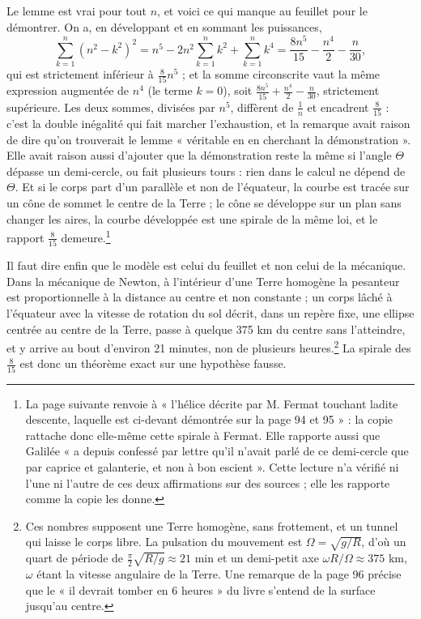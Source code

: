 \documentclass[11pt,a4paper]{article}
\begin{document}
Le lemme est vrai pour tout $n$, et voici ce qui manque au feuillet pour le
démontrer. On a, en développant et en sommant les puissances,
\[
\sum_{k=1}^{n}(n^2-k^2)^2 = n^5 - 2n^2\sum_{k=1}^{n} k^2 + \sum_{k=1}^{n}k^4
 = \frac{8n^5}{15} - \frac{n^4}{2} - \frac{n}{30},
\]
qui est strictement inférieur à $\frac{8}{15}n^5$ ; et la somme circonscrite
vaut la même expression augmentée de $n^4$ (le terme $k = 0$), soit
$\frac{8n^5}{15} + \frac{n^4}{2} - \frac{n}{30}$, strictement supérieure. Les
deux sommes, divisées par $n^5$, diffèrent de $\frac1n$ et encadrent
$\frac{8}{15}$ : c'est la double inégalité qui fait marcher l'exhaustion, et
la remarque avait raison de dire qu'on trouverait le lemme « véritable en en
cherchant la démonstration ». Elle avait raison aussi d'ajouter que la
démonstration reste la même si l'angle $\Theta$ dépasse un demi-cercle, ou
fait plusieurs tours : rien dans le calcul ne dépend de $\Theta$. Et si le
corps part d'un parallèle et non de l'équateur, la courbe est tracée sur un
cône de sommet le centre de la Terre ; le cône se développe sur un plan sans
changer les aires, la courbe développée est une spirale de la même loi, et le
rapport $\frac{8}{15}$ demeure.\footnote{La page suivante renvoie à « l'hélice
décrite par M. Fermat touchant ladite descente, laquelle est ci-devant démontrée
sur la page 94 et 95 » : la copie rattache donc elle-même cette spirale à
Fermat. Elle rapporte aussi que Galilée « a depuis confessé par lettre qu'il
n'avait parlé de ce demi-cercle que par caprice et galanterie, et non à bon
escient ». Cette lecture n'a vérifié ni l'une ni l'autre de ces deux
affirmations sur des sources ; elle les rapporte comme la copie les donne.}

Il faut dire enfin que le modèle est celui du feuillet et non celui de la
mécanique. Dans la mécanique de Newton, à l'intérieur d'une Terre homogène la
pesanteur est proportionnelle à la distance au centre et non constante ; un
corps lâché à l'équateur avec la vitesse de rotation du sol décrit, dans un
repère fixe, une ellipse centrée au centre de la Terre, passe à quelque 375 km
du centre sans l'atteindre, et y arrive au bout d'environ 21 minutes, non de
plusieurs heures.\footnote{Ces nombres supposent une Terre homogène, sans
frottement, et un tunnel qui laisse le corps libre. La pulsation du mouvement
est $\Omega = \sqrt{g/R}$, d'où un quart de période de $\frac{\pi}{2}\sqrt{R/g}
\approx 21$ min et un demi-petit axe $\omega R/\Omega \approx 375$ km, $\omega$
étant la vitesse angulaire de la Terre. Une remarque de la page 96 précise que
le « il devrait tomber en 6 heures » du livre s'entend de la surface jusqu'au
centre.} La spirale des $\frac{8}{15}$ est donc un théorème exact sur une
hypothèse fausse.
\end{document}

